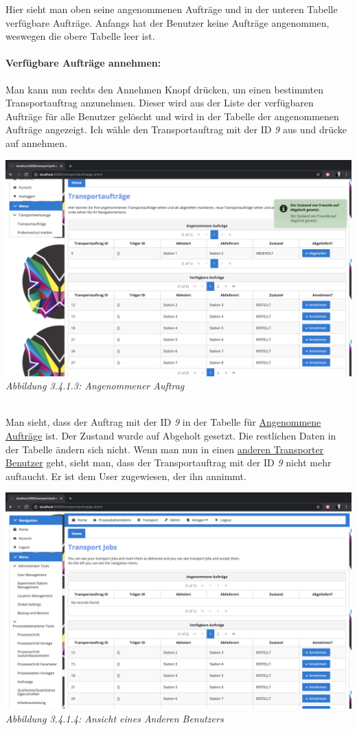 \documentclass[enabledeprecatedfontcommands,fontsize=12pt,paper=a4,twoside]{scrartcl}
\begin{document}
Hier sieht man oben seine angenommenen Aufträge und in der unteren Tabelle verfügbare Aufträge. Anfangs hat der Benutzer keine Aufträge angenommen, weswegen die obere Tabelle leer ist. 

\paragraph{Verfügbare Aufträge annehmen:}

Man kann nun rechts den Annehmen Knopf drücken, um einen bestimmten Transportauftrag anzunehmen. Dieser wird aus der Liste der verfügbaren Aufträge für alle Benutzer gelöscht und wird in der Tabelle der angenommenen Aufträge angezeigt. Ich wähle den Transportauftrag mit der ID \textit{9} aus und drücke auf annehmen. 

\hypertarget{sc3.4.1.3}{
\includegraphics[width=1\textwidth]{Screenshots/3413.png}
\textit{Abbildung 3.4.1.3: Angenommener Auftrag}
} \\

Man sieht, dass der Auftrag mit der ID \textit{9} in der Tabelle für \hyperlink{sc3.4.1.3}{Angenommene Aufträge} ist. Der Zustand wurde auf Abgeholt gesetzt. Die restlichen Daten in der Tabelle ändern sich nicht. Wenn man nun in einen  \hyperlink{sc3.4.1.4}{anderen Transporter Benutzer} geht, sieht man, dass der Transportauftrag mit der ID \textit{9} nicht mehr auftaucht. Er ist dem User zugewiesen, der ihn annimmt. 

\hypertarget{sc3.4.1.4}{
\includegraphics[width=1\textwidth]{Screenshots/3414.png}
\textit{Abbildung 3.4.1.4: Ansicht eines Anderen Benutzers}
} \\
\end{document}
